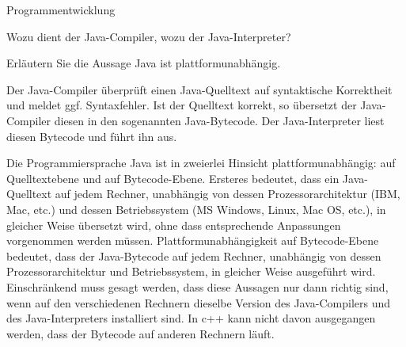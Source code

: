 \begin{exercise}{Programmentwicklung}
\begin{body}
\begin{parts}
\item Wozu dient der Java-Compiler, wozu der Java-Interpreter?
\item Erläutern Sie die Aussage \glqq Java ist plattformunabhängig.\grqq
\end{parts}
\end{body}

\begin{solution}
\begin{parts}
\item Der Java-Compiler überprüft einen Java-Quelltext auf syntaktische Korrektheit und meldet ggf. Syntaxfehler.
Ist der Quelltext korrekt, so übersetzt der Java-Compiler diesen in den sogenannten Java-Bytecode.
Der Java-Interpreter liest diesen Bytecode und führt ihn aus.

\item
Die Programmiersprache Java ist in zweierlei Hinsicht plattformunabhängig: auf Quelltextebene und auf Bytecode-Ebene.
Ersteres bedeutet, dass ein Java-Quelltext auf jedem Rechner, unabhängig von dessen Prozessorarchitektur (IBM, Mac, etc.) und dessen Betriebssystem (MS Windows, Linux, Mac OS, etc.), in gleicher Weise übersetzt wird, ohne dass entsprechende Anpassungen vorgenommen werden müssen.
Plattformunabhängigkeit auf Bytecode-Ebene bedeutet, dass der Java-Bytecode auf jedem Rechner, unabhängig von dessen Prozessorarchitektur und Betriebssystem, in gleicher Weise ausgeführt wird.
Einschränkend muss gesagt werden, dass diese Aussagen nur dann richtig sind, wenn auf den verschiedenen Rechnern dieselbe Version des Java-Compilers und des Java-Interpreters installiert sind.
In c++ kann nicht davon ausgegangen werden, dass der Bytecode auf anderen Rechnern läuft.
\end{parts}
\end{solution}
\end{exercise}
